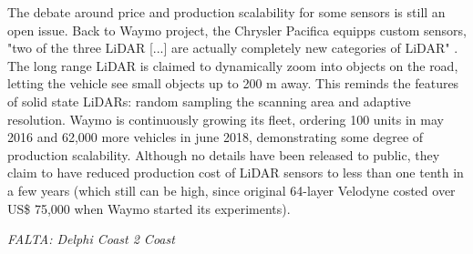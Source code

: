 The debate around price and production scalability for some sensors is still
an open issue. Back to Waymo project, the Chrysler Pacifica equipps custom 
sensors, "two of the three LiDAR [...] are actually 
completely new categories of LiDAR" \cite{Waymoteam2017}. The long range 
LiDAR is claimed to dynamically zoom into objects on the road, letting the
vehicle see small objects up to 200 m away. 
This  reminds the features of solid state LiDARs: random sampling the scanning 
area and adaptive resolution. Waymo is continuously growing its fleet, ordering 
100 units in may 2016 and 62,000 more vehicles in june 2018, demonstrating some 
degree of production scalability. 
Although no details have been released to public, they claim to have reduced
production cost of LiDAR sensors to less than one tenth in a few years 
(which still can be high, since original 64-layer Velodyne costed over 
US\$ 75,000 when Waymo started its experiments).


\emph{FALTA: Delphi Coast 2 Coast}

